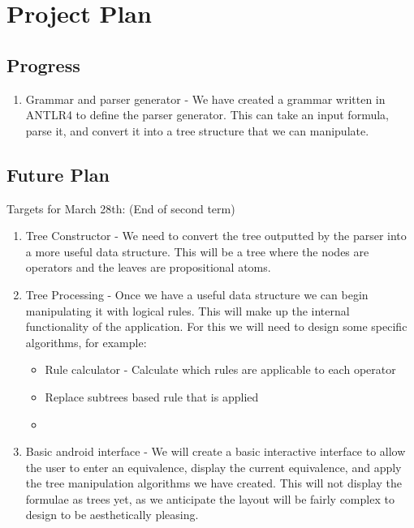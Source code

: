 \documentclass{report}
\begin{document}
\chapter{Project Plan}

\section{Progress}

\begin{enumerate}
\item Grammar and parser generator - We have created a grammar written in ANTLR4 to define the parser generator. This can take an input formula, parse it, and convert it into a tree structure that we can manipulate.
\end{enumerate}

\section{Future Plan}

Targets for March 28th: (End of second term)

\begin{enumerate}
\item Tree Constructor - We need to convert the tree outputted by the parser into a more useful data structure. This will be a tree where the nodes are operators and the leaves are propositional atoms.
\item Tree Processing - Once we have a useful data structure we can begin manipulating it with logical rules. This will make up the internal functionality of the application. For this we will need to design some specific algorithms, for example:

\begin{itemize}
\item Rule calculator - Calculate which rules are applicable to each operator
\item Replace subtrees based rule that is applied
\item 
\end{itemize}

\item Basic android interface - We will create a basic interactive interface to allow the user to enter an equivalence, display the current equivalence, and apply the tree manipulation algorithms we have created. This will not display the formulae as trees yet, as we anticipate the layout will be fairly complex to design to be aesthetically pleasing.
\end{enumerate}
\end{document}
